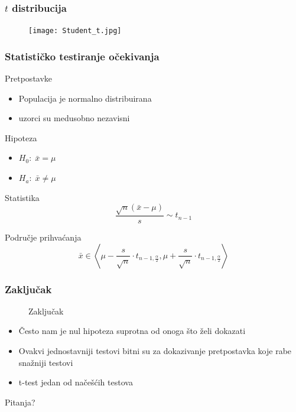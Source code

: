\documentclass{beamer}
\begin{document}
\begin{frame}
	\frametitle{$t$ distribucija}
	\begin{figure}
		\centering
	    \texttt{[image: Student\_t.jpg]}
	\end{figure}
\end{frame}

\begin{frame}
	\frametitle{Statističko testiranje očekivanja}
	\begin{block}{Pretpostavke}
		\begin{itemize}
			\item Populacija je normalno distribuirana
			\item uzorci su medusobno nezavisni
		\end{itemize}
	\end{block}
	\pause
	\begin{block}{Hipoteza}
		\begin{itemize}
			\item $H_0:\; \bar{x} = \mu$
			\item $H_a:\; \bar{x} \ne \mu$
		\end{itemize}
	\end{block}
	\pause
	\begin{block}{Statistika}
		\[\frac{\sqrt{n} (\bar{x} - \mu)}{s} \sim t_{n-1}\]
	\end{block}
	\pause
	\begin{block}{Područje prihvaćanja}
		\[
		\bar{x} \in \left<\mu - \frac{s}{\sqrt{n}} \cdot t_{n-1, \frac{\alpha}{2}}, \mu + \frac{s}{\sqrt{n}} \cdot t_{n-1, \frac{\alpha}{2}} \right> \]

	\end{block}
\end{frame}

\begin{frame}
	\frametitle{Zaključak}
	\begin{figure}
		\centering
		\huge Zaključak
	\end{figure}

	\begin{itemize}[<+->]
		\item Često nam je nul hipoteza suprotna od onoga što želi dokazati
		\item Ovakvi jednostavniji testovi bitni su za dokazivanje pretpostavka koje rabe snažniji testovi
		\item t-test jedan od načešćih testova 
	\end{itemize}
\end{frame}

\begin{frame}
	\Huge{\centerline{Pitanja?}}
\end{frame}
\end{document}
